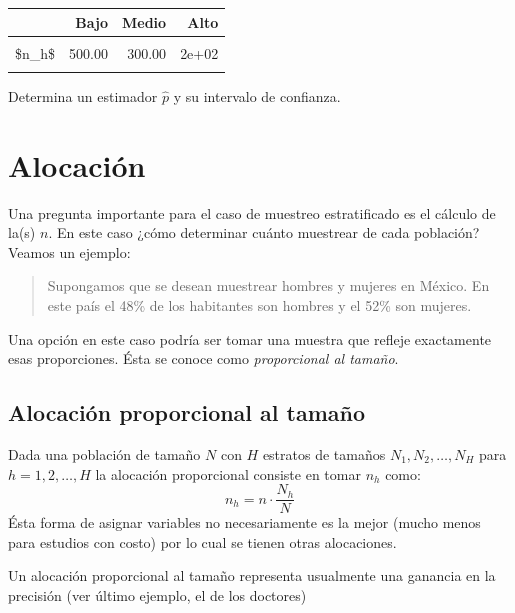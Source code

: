 \documentclass[
]{book}
\begin{document}
\begin{table}
\centering
\begin{tabular}{l|r|r|r}
\hline
  & Bajo & Medio & Alto\\
\hline
\cellcolor{gray!6}{\$N\_h\$} & \cellcolor{gray!6}{3500.00} & \cellcolor{gray!6}{2000.00} & \cellcolor{gray!6}{2e+03}\\
\hline
\$n\_h\$ & 500.00 & 300.00 & 2e+02\\
\hline
\cellcolor{gray!6}{\$p\_h\$} & \cellcolor{gray!6}{0.13} & \cellcolor{gray!6}{0.45} & \cellcolor{gray!6}{5e-01}\\
\hline
\end{tabular}
\end{table}

Determina un estimador \(\hat{p}\) y su intervalo de confianza.

\hypertarget{alocaciuxf3n}{%
\section{Alocación}\label{alocaciuxf3n}}

Una pregunta importante para el caso de muestreo estratificado es el cálculo de la(s) \(n\). En este caso ¿cómo determinar cuánto muestrear de cada población? Veamos un ejemplo:

\begin{quote}
Supongamos que se desean muestrear hombres y mujeres en México. En este país el 48\% de los habitantes son hombres y el 52\% son mujeres.
\end{quote}

Una opción en este caso podría ser tomar una muestra que refleje exactamente esas proporciones. Ésta se conoce como \emph{proporcional al tamaño}.

\hypertarget{alocaciuxf3n-proporcional-al-tamauxf1o}{%
\subsection{Alocación proporcional al tamaño}\label{alocaciuxf3n-proporcional-al-tamauxf1o}}

Dada una población de tamaño \(N\) con \(H\) estratos de tamaños \(N_1, N_2, \dots, N_H\) para \(h = 1,2,\dots, H\) la alocación proporcional consiste en tomar \(n_h\) como:
\[
n_h = n\cdot \dfrac{N_h}{N}
\]
Ésta forma de asignar variables no necesariamente es la mejor (mucho menos para estudios con costo) por lo cual se tienen otras alocaciones.

Un alocación proporcional al tamaño representa usualmente una ganancia en la precisión (ver último ejemplo, el de los doctores)
\end{document}
